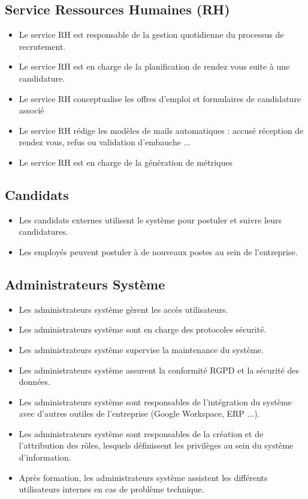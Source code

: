 \documentclass{scrreprt}
\begin{document}
\subsection{Service Ressources Humaines (RH)}
\begin{itemize}
    \item Le service RH est responsable de la gestion quotidienne du processus de recrutement.

    \item Le service RH est en charge de la planification de rendez vous suite à une candidature.

    \item Le service RH  conceptualise les offres d'emploi et formulaires de candidature associé

    \item Le service RH rédige les modèles de mails automatiques : accusé réception de rendez vous, refus ou validation d'embauche ...

    \item Le service RH est en charge de la génération de métriques
    
     
\end{itemize}

\subsection{Candidats}
\begin{itemize}
    \item Les candidats externes utilisent le système pour postuler et suivre leurs candidatures.
    \item  Les employés peuvent postuler à de nouveaux postes au sein de l'entreprise.
\end{itemize}

\subsection{Administrateurs Système}
\begin{itemize}
    \item Les administrateurs système gèrent les accès utilisateurs.
    \item Les administrateurs système sont en charge des protocoles sécurité.  
    \item Les administrateurs système supervise la maintenance du système.
    \item Les administrateurs système assurent la conformité RGPD et la sécurité des données.
    \item Les administrateurs système sont responsables de l'intégration du système avec d'autres outiles de l'entreprise (Google Workspace, ERP ...).
    \item Les administrateurs système sont responsables de la création et de l’attribution des rôles, lesquels définissent les privilèges au sein du système d’information.
    \item Après formation, les administrateurs système assistent les différents utilisateurs internes en cas de problème technique.

\end{itemize}
\end{document}

